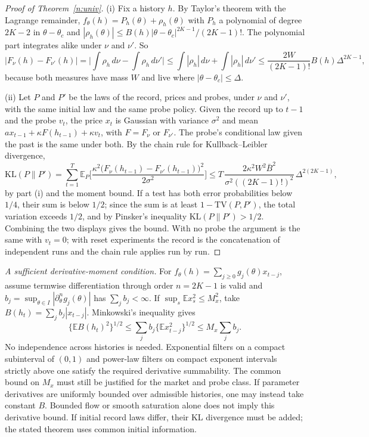 \documentclass[12pt]{article}
\theoremstyle{definition}
\theoremstyle{remark}
\begin{document}
\begin{proof}[Proof of Theorem~\ref{n:univ}]
(i) Fix a history $h$. By Taylor's theorem with the Lagrange remainder, $f_\theta(h)=P_h(\theta)+\rho_h(\theta)$ with $P_h$ a polynomial of degree $2K-2$ in $\theta-\theta_c$ and $|\rho_h(\theta)|\le B(h)|\theta-\theta_c|^{2K-1}/(2K-1)!$. The polynomial part integrates alike under $\nu$ and $\nu'$. So
\[
|F_\nu(h)-F_{\nu'}(h)|=\Big|\int\rho_h\,d\nu-\int\rho_h\,d\nu'\Big|\le\int|\rho_h|\,d\nu+\int|\rho_h|\,d\nu'\le\frac{2W}{(2K-1)!}B(h)\Delta^{2K-1},
\]
because both measures have mass $W$ and live where $|\theta-\theta_c|\le\Delta$.

(ii) Let $P$ and $P'$ be the laws of the record, prices and probes, under $\nu$ and $\nu'$, with the same initial law and the same probe policy. Given the record up to $t-1$ and the probe $v_t$, the price $x_t$ is Gaussian with variance $\sigma^2$ and mean $ax_{t-1}+\kappa F(h_{t-1})+\kappa v_t$, with $F=F_\nu$ or $F_{\nu'}$. The probe's conditional law given the past is the same under both. By the chain rule for Kullback--Leibler divergence,
\[
\mathrm{KL}(P\|P')=\sum_{t=1}^{T}\mathbb E_P\Big[\frac{\kappa^2\big(F_\nu(h_{t-1})-F_{\nu'}(h_{t-1})\big)^2}{2\sigma^2}\Big]\le T\,\frac{2\kappa^2W^2\bar B^2}{\sigma^2((2K-1)!)^2}\,\Delta^{2(2K-1)},
\]
by part (i) and the moment bound. If a test has both error probabilities below $1/4$, their sum is below $1/2$; since the sum is at least $1-\mathrm{TV}(P,P')$, the total variation exceeds $1/2$, and by Pinsker's inequality $\mathrm{KL}(P\|P')>1/2$. Combining the two displays gives the bound. With no probe the argument is the same with $v_t=0$; with reset experiments the record is the concatenation of independent runs and the chain rule applies run by run.
\end{proof}

\noindent\emph{A sufficient derivative-moment condition.} For $f_\theta(h)=\sum_{j\ge0}g_j(\theta)x_{t-j}$, assume termwise differentiation through order $n=2K-1$ is valid and $b_j=\sup_{\theta\in I}|\partial_\theta^n g_j(\theta)|$ has $\sum_jb_j<\infty$. If $\sup_s\mathbb E x_s^2\le M_x^2$, take $B(h_t)=\sum_jb_j|x_{t-j}|$. Minkowski's inequality gives
\[
\{\mathbb E B(h_t)^2\}^{1/2}\le\sum_j b_j\{\mathbb E x_{t-j}^2\}^{1/2}\le M_x\sum_jb_j.
\]
No independence across histories is needed. Exponential filters on a compact subinterval of $(0,1)$ and power-law filters on compact exponent intervals strictly above one satisfy the required derivative summability. The common bound on $M_x$ must still be justified for the market and probe class. If parameter derivatives are uniformly bounded over admissible histories, one may instead take constant $B$. Bounded flow or smooth saturation alone does not imply this derivative bound. If initial record laws differ, their KL divergence must be added; the stated theorem uses common initial information.
\end{document}
